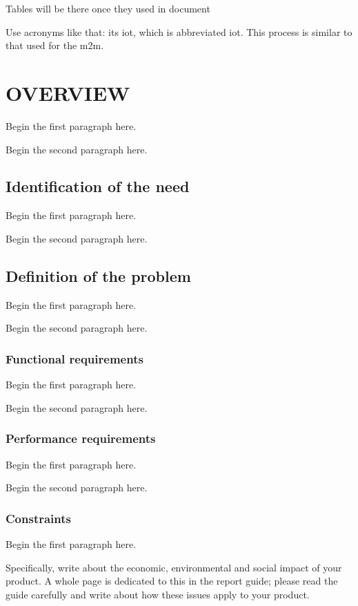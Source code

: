 \documentclass{article}
\begin{document}
\newpage
\tableofcontents

\newpage
\listoftables
Tables will be there once they used in document

\listoffigures
{}

\newpage
\printglossary[title=LIST OF ABBREVIATIONS, type=\acronymtype]
Use acronyms like that:
its \acrlong{iot}, which is abbreviated \acrshort{iot}. This process 
is similar to that used for the \acrfull{m2m}.

\newpage
\setcounter{secnumdepth}{3}
\section{\centering OVERVIEW}
Begin the first paragraph here.
\par
Begin the second paragraph here.

\subsection{Identification of the need}
Begin the first paragraph here.
\par
Begin the second paragraph here.

\subsection{Definition of the problem}
Begin the first paragraph here.
\par
Begin the second paragraph here.

\subsubsection{Functional requirements}
Begin the first paragraph here.
\par
Begin the second paragraph here.

\subsubsection{Performance requirements}
Begin the first paragraph here.
\par
Begin the second paragraph here.

\subsubsection{Constraints}
Begin the first paragraph here.
\par
Specifically, write about the economic, environmental and social impact of your product. A whole page is dedicated to this in the report guide; please read the guide carefully and write about how these issues apply to your product.
\end{document}

